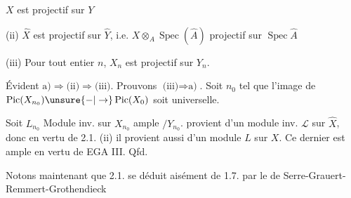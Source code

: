  $X$ est projectif sur $Y$

(ii) $\widehat X$ est projectif sur $\widehat Y$, i.e. $X\otimes_A\operatorname{Spec}(\widehat A)$ projectif sur $\operatorname{Spec}\widehat A$

(iii) Pour tout entier $n$, $X_n$ est projectif sur $Y_n$.

Évident $\text{a)}\Rightarrow\text{(ii)}\Rightarrow\text{(iii)}$. Prouvons $\text{(iii)}\Rightarrow\text{a)}$. Soit $n_0$ tel que l'image de $\operatorname{Pic}(X_{n_0})\unsure{-|\to}\operatorname{Pic}(X_0)$ soit universelle.

Soit $L_{n_0}$ Module inv. sur $X_{n_0}$ ample $/Y_{n_0}$.   provient d'un module inv. $\mathcal L$ sur $\widehat X$, donc en vertu de  2.1. (ii) il provient aussi d'un module  $L$ sur $X$. Ce dernier est ample en vertu de EGA III. Qfd.


Notons maintenant que 2.1.  se déduit aisément de 1.7. par le  de Serre-Grauert-Remmert-Grothendieck

